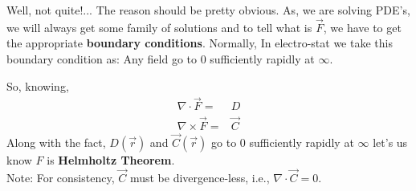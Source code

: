 \documentclass{article}
\begin{document}
Well, not quite!... The reason should be pretty obvious. As, we are solving PDE's, we will always get some family of solutions and to tell what is $\vec{F}$, we have to get the appropriate \textbf{boundary conditions}. Normally, In electro-stat we take this boundary condition as: Any field go to $0$ sufficiently rapidly at $\infty$.

So, knowing,
\begin{equation}
    \begin{split}
        \nabla \cdot \vec{F} =& D\\
        \nabla \times \vec{F}=& \vec{C}
        \end{split}
\end{equation}
Along with the fact, $D(\vec{r})$ and $\vec{C}(\vec{r})$ go to $0$ sufficiently rapidly at $\infty$ let's us know $F$ is \textbf{Helmholtz Theorem}.\\
Note: For consistency, $\vec{C}$ must be divergence-less, i.e., $\nabla \cdot \vec{C} = 0$.\\
\end{document}
